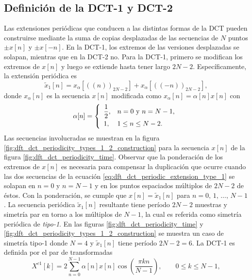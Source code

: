\documentclass[a4paper]{report}
\begin{document}
\subsection{Definición de la DCT-1 y DCT-2} 

Las extensiones periódicas que conducen a las distintas formas de la DCT pueden construirse mediante la suma de copias desplazadas de las secuencias de \(N\) puntos \(\pm x[n]\) y \(\pm x[-n]\). En la DCT-1, los extremos de las versiones desplazadas se solapan, mientras que en la DCT-2 no. Para la DCT-1, primero se modifican los extremos de \(x[n]\) y luego se extiende hasta tener largo \(2N-2\). Específicamente, la extensión periódica es 
\begin{equation}\label{eq:dft_dct_periodic_extension_type_1}
 \tilde{x}_1[n]=x_\alpha[((n))_{2N-2}]+x_\alpha[((-n))_{2N-2}], 
\end{equation}
donde \(x_\alpha[n]\) es la secuencia \(x[n]\) modificada como \(x_\alpha[n]=\alpha[n]x[n]\) con
\begin{equation}\label{eq:dft_dct_1_definition_alpha}
 \alpha[n]=
 \left\{ 
 \begin{array}{ll}
  \dfrac{1}{2}, & n=0\textrm{ y }n=N-1,\\[\medskipamount]
  1, & 1\leq n\leq N-2.
 \end{array}
 \right.  
\end{equation}
Las secuencias involucradas se muestran en la figura \ref{fig:dft_dct_periodicity_types_1_2_construction} para la secuencia \(x[n]\) de la figura \ref{fig:dft_dct_periodicity_time}. Observar que la ponderación de los extremos de \(x[n]\) es necesaria para compensar la duplicación que ocurre cuando las dos secuencias de la ecuación \ref{eq:dft_dct_periodic_extension_type_1} se solapan en \(n=0\) y \(n=N-1\) y en los puntos espaciados múltiplos de \(2N-2\) de éstos. Con la ponderación, se cumple que \(x[n]=\tilde{x}_1[n]\) para \(n=0,\,1,\,\dots,\,N-1\). La secuencia periódica \(\tilde{x}_1[n]\) resultante tiene período \(2N-2\) muestras y simetría par en torno a los múltiplos de \(N-1\), la cual es referida como simetría periódica de \emph{tipo-1}. En las figuras \ref{fig:dft_dct_periodicity_time} y \ref{fig:dft_dct_periodicity_types_1_2_construction} se muestra un caso de simetría tipo-1 donde \(N=4\) y \(\tilde{x}_1[n]\) tiene período \(2N-2=6\). La DCT-1 es definida por el par de transformadas
\begin{equation}\label{eq:dft_dct_1_definition}
 X^{c1}[k]=2\sum_{n=0}^{N-1}\alpha[n]x[n]\cos\left(\frac{\pi k n}{N-1}\right),
 \qquad 0\leq k\leq N-1,
\end{equation}
\end{document}
